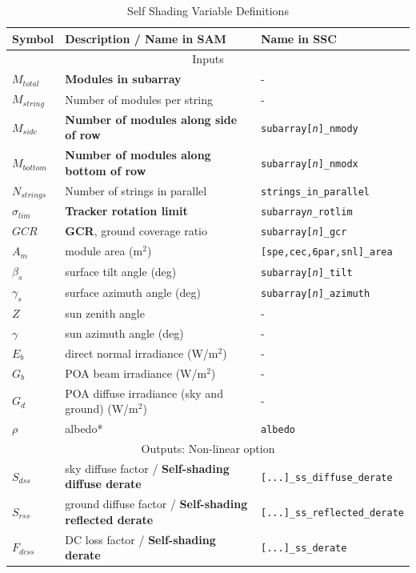 \documentclass[12pt,letterpaper]{article}
\newcommand\GCR{\ensuremath{\mathit{GCR}}}
\begin{document}
\begin{table}
\begin{center}
\caption{Self Shading Variable Definitions}
\begin{tabular}{lll}
\midrule
Symbol & Description / \textbf{Name in SAM} & Name in SSC\\
\midrule
\multicolumn{3}{c}{Inputs}\\
$M_{total}$ & \textbf{Modules in subarray} & -\\
$M_{string}$ & Number of modules per string & -\\
$M_{side}$ & \textbf{Number of modules along side of row} & \texttt{subarray[\textit{n}]\_nmody}\\
$M_{bottom}$ & \textbf{Number of modules along bottom of row} & \texttt{subarray[\textit{n}]\_nmodx}\\
$N_{strings}$ & Number of strings in parallel & \texttt{strings\_in\_parallel}\\
$\sigma_{\mathit{lim}}$ & \textbf{Tracker rotation limit} & \texttt{subarray\textit{n}\_rotlim} \\
$\GCR$ & \textbf{GCR}, ground coverage ratio & \texttt{subarray[\textit{n}]\_gcr}\\
$A_m$ & module area (m$^2$)& \texttt{[spe,cec,6par,snl]\_area}\\
$\beta_s$ & surface tilt angle (deg)& \texttt{subarray[\textit{n}]\_tilt} \\
$\gamma_s$ & surface azimuth angle (deg)& \texttt{subarray[\textit{n}]\_azimuth} \\
$Z$ & sun zenith angle & -\\
$\gamma$ & sun azimuth angle (deg)& - \\
$E_b$ & direct normal irradiance (W/m$^2$) & - \\
$G_b$ & POA beam irradiance (W/m$^2$)& - \\
$G_d$ & POA diffuse irradiance (sky and ground) (W/m$^2$)& - \\
$\rho$ & albedo*& \texttt{albedo} \\
\midrule
\multicolumn{3}{c}{Outputs: Non-linear option}\\
$S_{dss}$ & sky diffuse factor  / \textbf{Self-shading diffuse derate}& \texttt{[...]\_ss\_diffuse\_derate}\\
$S_{rss}$ & ground diffuse factor  / \textbf{Self-shading reflected derate}& \texttt{[...]\_ss\_reflected\_derate}\\
$F_{dcss}$& DC loss factor / \textbf{Self-shading derate} & \texttt{[...]\_ss\_derate}\\

\end{tabular}
\end{center}
\end{table}
\end{document}

